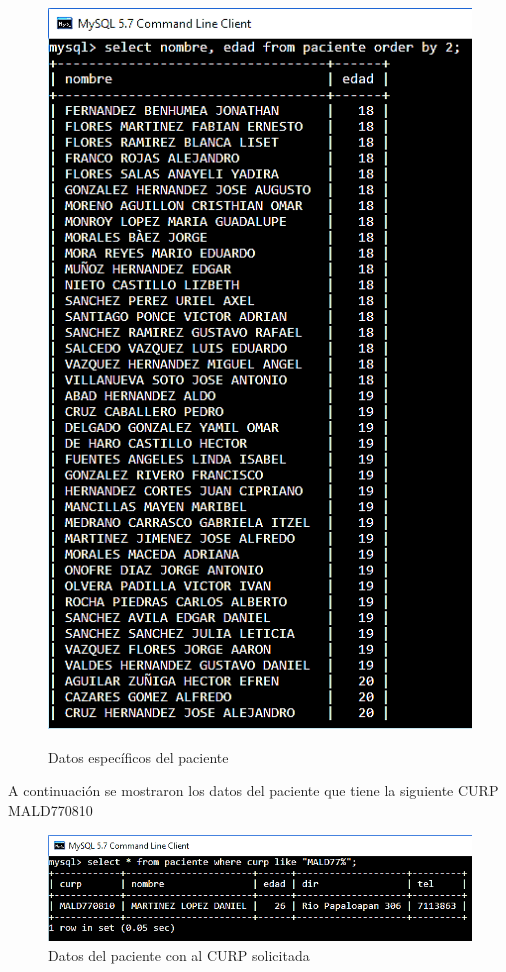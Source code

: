 \documentclass[12pt, titlepage]{article}
\begin{document}
	\begin{figure}[H]
		\begin{center}
			\includegraphics[width=\textwidth]{img/dos.png}
			\label{fig:dos}
			\caption{Datos específicos del paciente}
		\end{center}
	\end{figure}
	A continuación se mostraron los datos del paciente que tiene la siguiente CURP MALD770810
	\begin{figure}[H]
		\begin{center}
			\includegraphics[width=\textwidth]{img/tres.png}
			\caption{Datos del paciente con al CURP solicitada}
			\label{fig:tres}
		\end{center}
	\end{figure}
\end{document}
